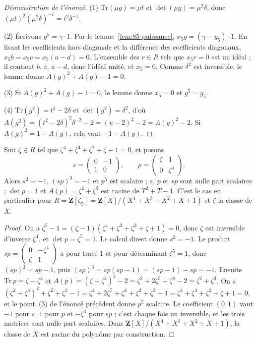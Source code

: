 \begin{proof}[Démonstration de l'énoncé]
(1) $\mathrm{Tr}(\mu g) = \mu t$ et $\det(\mu g) = \mu^2 \delta$, donc $(\mu t)^2 (\mu^2\delta)^{-1} = t^2 \delta^{-1}$.

(2) Écrivons $g^5 = \gamma \cdot 1$. Par le lemme~\ref{lem:85-puissance}, $x_5 g = (\gamma - y_5)\cdot 1$. En lisant les coefficients hors diagonale et la différence des coefficients diagonaux, $x_5 b = x_5 c = x_5 (a - d) = 0$. L'ensemble des $r \in R$ tels que $x_5 r = 0$ est un idéal ; il contient $b$, $c$, $a - d$, donc l'idéal unité, et $x_5 = 0$. Comme $\delta^2$ est inversible, le lemme donne $A(g)^2 + A(g) - 1 = 0$.

(3) Si $A(g)^2 + A(g) - 1 = 0$, le lemme donne $x_5 = 0$ et $g^5 = y_5$.

(4) $\mathrm{Tr}(g^2) = t^2 - 2\delta$ et $\det(g^2) = \delta^2$, d'où $A(g^2) = (t^2 - 2\delta)^2\delta^{-2} - 2 = (u - 2)^2 - 2 = A(g)^2 - 2$. Si $A(g)^2 = 1 - A(g)$, cela vaut $-1 - A(g)$.
\end{proof}

\begin{enonce}
Soit $\zeta \in R$ tel que $\zeta^4 + \zeta^3 + \zeta^2 + \zeta + 1 = 0$, et posons
\[
  s = \begin{pmatrix} 0 & -1 \\ 1 & 0 \end{pmatrix}, \qquad p = \begin{pmatrix} \zeta & 1 \\ 0 & \zeta^4 \end{pmatrix}.
\]
Alors $s^2 = -1$, $(sp)^3 = -1$ et $p^5$ est scalaire ; $s$, $p$ et $sp$ sont nulle part scalaires ; $\det p = 1$ et $A(p) = \zeta^2 + \zeta^3$ est racine de $T^2 + T - 1$. C'est le cas en particulier pour $R = \mathbf Z[\zeta_5] = \mathbf Z[X]/(X^4 + X^3 + X^2 + X + 1)$ et $\zeta$ la classe de $X$.
\end{enonce}

\begin{proof}
On a $\zeta^5 - 1 = (\zeta - 1)(\zeta^4 + \zeta^3 + \zeta^2 + \zeta + 1) = 0$, donc $\zeta$ est inversible d'inverse $\zeta^4$, et $\det p = \zeta^5 = 1$. Le calcul direct donne $s^2 = -1$. Le produit $sp = \begin{pmatrix} 0 & -\zeta^4 \\ \zeta & 1 \end{pmatrix}$ a pour trace $1$ et pour déterminant $\zeta^5 = 1$, donc $(sp)^2 = sp - 1$, puis $(sp)^3 = sp(sp - 1) = (sp - 1) - sp = -1$. Ensuite $\mathrm{Tr}\, p = \zeta + \zeta^4$ et $A(p) = (\zeta + \zeta^4)^2 - 2 = \zeta^2 + 2\zeta^5 + \zeta^8 - 2 = \zeta^2 + \zeta^3$. On a $(\zeta^2 + \zeta^3)^2 + \zeta^2 + \zeta^3 - 1 = \zeta^4 + 2\zeta^5 + \zeta^6 + \zeta^2 + \zeta^3 - 1 = \zeta^4 + \zeta^3 + \zeta^2 + \zeta + 1 = 0$, et le point~(3) de l'énoncé précédent donne $p^5$ scalaire. Le coefficient $(0,1)$ vaut $-1$ pour $s$, $1$ pour $p$ et $-\zeta^4$ pour $sp$ ; c'est chaque fois un inversible, et les trois matrices sont nulle part scalaires. Dans $\mathbf Z[X]/(X^4 + X^3 + X^2 + X + 1)$, la classe de $X$ est racine du polynôme par construction.
\end{proof}

